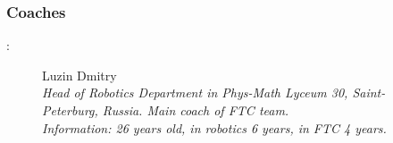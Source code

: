 \subsubsection{Coaches}:

\begin{figure}[H]
	
	\begin{minipage}[h]{0.47\linewidth}
		Luzin Dmitry\\
		\emph{Head of Robotics Department in Phys-Math Lyceum 30, Saint-Peterburg, Russia. Main coach of FTC team.\\}
		\emph{Information: 26 years old, in robotics 6 years, in FTC 4 years.}
	\end{minipage}
	\hfill
	\begin{minipage}{0.47\linewidth}
		\\
	\end{minipage}
	\vfill
	\begin{minipage}[h]{0.47\linewidth}

\end{minipage}
\end{figure}
